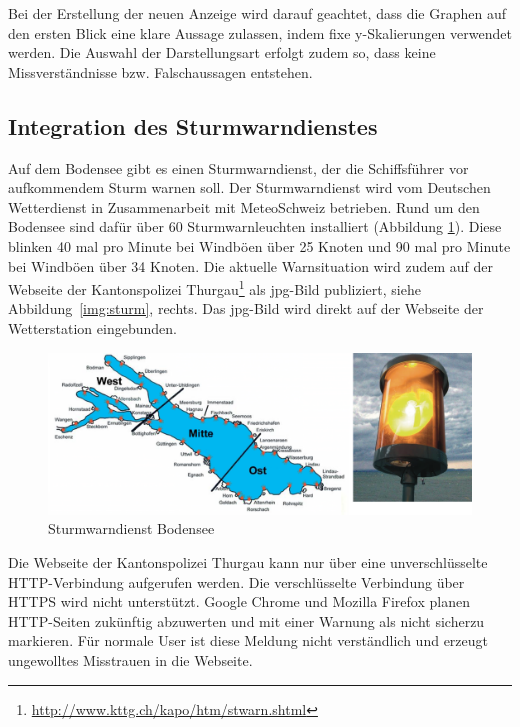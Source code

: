 \noindent
Bei der Erstellung der neuen Anzeige wird darauf geachtet, dass die Graphen auf den ersten Blick eine klare Aussage zulassen, indem fixe y-Skalierungen verwendet werden. Die Auswahl der Darstellungsart erfolgt zudem so, dass keine Missverständnisse bzw. Falschaussagen entstehen.



\subsection{Integration des Sturmwarndienstes}
\label{subsec:sturmwarnung}

Auf dem Bodensee gibt es einen Sturmwarndienst, der die Schiffsführer vor aufkommendem Sturm warnen soll. Der Sturmwarndienst wird vom Deutschen Wetterdienst in Zusammenarbeit mit MeteoSchweiz betrieben. Rund um den Bodensee sind dafür über 60 Sturmwarnleuchten installiert (Abbildung \ref{img:sturm2}). Diese blinken 40 mal pro Minute bei Windböen  über 25 Knoten und 90 mal pro Minute bei Windböen über 34 Knoten. Die aktuelle Warnsituation wird zudem auf der Webseite der Kantonspolizei Thurgau\footnote{ \url{http://www.kttg.ch/kapo/htm/stwarn.shtml}} als jpg-Bild publiziert, siehe Abbildung~\ref{img:sturm}, rechts. Das jpg-Bild wird direkt auf der Webseite der Wetterstation eingebunden.
\newline

\begin{figure}[h!]
	\centering
	\includegraphics[width=1\linewidth]{img/sturm2}
	\caption{Sturmwarndienst Bodensee}
	\label{img:sturm2}
\end{figure}

\noindent
Die Webseite der Kantonspolizei Thurgau kann nur über eine unverschlüsselte HTTP-Verbindung aufgerufen werden. Die verschlüsselte Verbindung über HTTPS wird nicht unterstützt. Google Chrome und Mozilla Firefox planen HTTP-Seiten zukünftig abzuwerten und mit einer Warnung als \flqq nicht sicher\frqq zu markieren\cite{Chromium:marking-http-as-non-secure}\cite{Mozilla:DeprecatingNon-SecureHTTP}. Für normale User ist diese Meldung nicht verständlich und erzeugt ungewolltes Misstrauen in die Webseite. 

